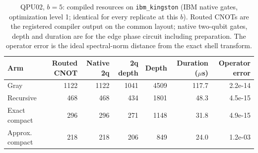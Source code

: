 \begin{table}[htbp]\centering\small
\caption{QPU02, $b=5$: compiled resources on \texttt{ibm\_kingston} (IBM native gates, optimization level 1; identical for every replicate at this $b$). Routed CNOTs are the registered compiler output on the common layout; native two-qubit gates, depth and duration are for the edge phase circuit including preparation. The operator error is the ideal spectral-norm distance from the exact shell transform.}\label{tab:q2res-b5}
\begin{tabular}{lrrrrrr}\toprule Arm & Routed CNOT & Native 2q & 2q depth & Depth & Duration ($\mu$s) & Operator error\\\midrule
Gray & 1122 & 1122 & 1041 & 4509 & 117.7 & 2.2e-14\\
Recursive & 468 & 468 & 434 & 1801 & 48.3 & 4.5e-15\\
Exact compact & 296 & 296 & 271 & 1148 & 31.8 & 4.9e-15\\
Approx. compact & 218 & 218 & 206 & 849 & 24.0 & 1.2e-03\\
\bottomrule\end{tabular}\end{table}

